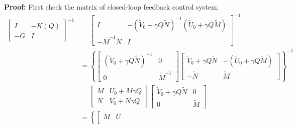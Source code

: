 \documentclass[a4paper,fleqn]{cas-sc}
\begin{document}
\textbf{Proof:} First check the matrix of closed-loop feedback control system.
\begin{equation}
  \begin{aligned}
    \left[\begin{array}{cc}
        I  & -K(Q) \\
        -G & I
      \end{array}\right]^{-1} & =\left[\begin{array}{cc}
        I                         & -(\tilde{V}_{0}+\gamma Q \tilde{N})^{-1} (\tilde{U}_{0}+\gamma Q \tilde{M}) \\
        -\tilde{M}^{-1} \tilde{N} & I
      \end{array}\right]^{-1}                                                                                                                                                 \\
                                                 & =\left\{\left[\begin{array}{cc}
        (\tilde{V}_{0}+\gamma Q \tilde{N})^{-1} & 0              \\
        0                                       & \tilde{M}^{-1}
      \end{array}\right]\left[\begin{array}{cc}
        \tilde{V}_{0}+\gamma Q \tilde{N} & -(\tilde{U}_{0}+\gamma Q \tilde{M}) \\
        -\tilde{N}                       & \tilde{M}
      \end{array}\right]\right\}^{-1}                                                                                           \\
                                                 & =\left[\begin{array}{cc}
        M & U_{0}+M \gamma Q \\
        N & V_{0}+N \gamma Q
      \end{array}\right]\left[\begin{array}{cc}
        \tilde{V}_{0}+\gamma Q \tilde{N} & 0         \\
        0                                & \tilde{M}
      \end{array}\right]                                                                                                               \\
                                                 & =\left\{\left[\begin{array}{ll}
        M & U \\

\end{array}
\end{aligned}
\end{equation}
\end{document}
